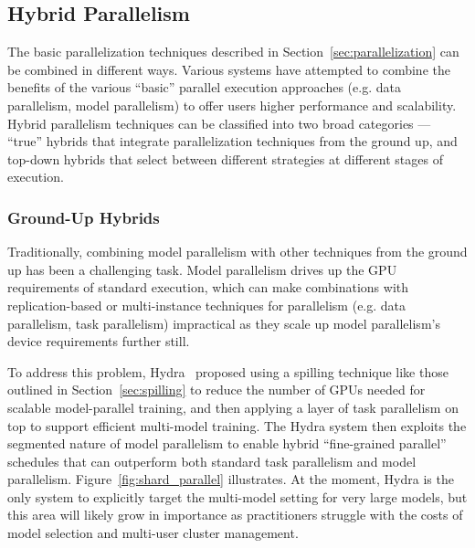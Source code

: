 \subsection{Hybrid Parallelism}
The basic parallelization techniques described in Section~\ref{sec:parallelization} can be combined in different ways. Various systems have attempted to combine the benefits of the various ``basic'' parallel execution approaches (e.g. data parallelism, model parallelism) to offer users higher performance and scalability. Hybrid parallelism techniques can be classified into two broad categories --- ``true'' hybrids that integrate parallelization techniques from the ground up, and top-down hybrids that select between different strategies at different stages of execution. 

\subsubsection{Ground-Up Hybrids}\label{sec:mt_parallel}
Traditionally, combining model parallelism with other techniques from the ground up has been a challenging task. Model parallelism drives up the GPU requirements of standard execution, which can make combinations with replication-based or multi-instance techniques for parallelism (e.g. data parallelism, task parallelism) impractical as they scale up model parallelism's device requirements further still. 

To address this problem, Hydra~\cite{hydra2021} proposed using a spilling technique like those outlined in Section~\ref{sec:spilling} to reduce the number of GPUs needed for scalable model-parallel training, and then applying a layer of task parallelism on top to support efficient multi-model training. The Hydra system then exploits the segmented nature of model parallelism to enable hybrid ``fine-grained parallel'' schedules that can outperform both standard task parallelism and model parallelism. Figure~\ref{fig:shard_parallel} illustrates. At the moment, Hydra is the only system to explicitly target the multi-model setting for very large models, but this area will likely grow in importance as practitioners struggle with the costs of model selection and multi-user cluster management.

